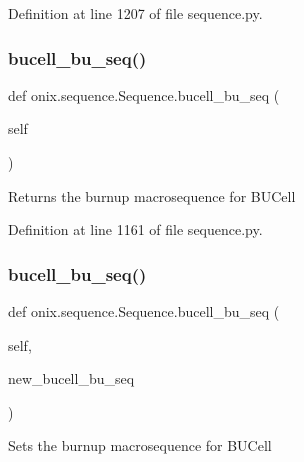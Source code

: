 Definition at line 1207 of file sequence.\+py.

\mbox{\label{classonix_1_1sequence_1_1Sequence_afb77125acf18a4aa9f7bae89253684f0}} 
\subsubsection{\texorpdfstring{bucell\+\_\+bu\+\_\+seq()}{bucell\_bu\_seq()}\hspace{0.1cm}{\footnotesize\ttfamily [1/2]}}
{\footnotesize\ttfamily def onix.\+sequence.\+Sequence.\+bucell\+\_\+bu\+\_\+seq (\begin{DoxyParamCaption}\item[{}]{self }\end{DoxyParamCaption})}

\begin{DoxyVerb}Returns the burnup macrosequence for BUCell
\end{DoxyVerb}
 

Definition at line 1161 of file sequence.\+py.

\mbox{\label{classonix_1_1sequence_1_1Sequence_a9d8dfff357d1253c857116e8ea58fc82}} 
\subsubsection{\texorpdfstring{bucell\+\_\+bu\+\_\+seq()}{bucell\_bu\_seq()}\hspace{0.1cm}{\footnotesize\ttfamily [2/2]}}
{\footnotesize\ttfamily def onix.\+sequence.\+Sequence.\+bucell\+\_\+bu\+\_\+seq (\begin{DoxyParamCaption}\item[{}]{self,  }\item[{}]{new\+\_\+bucell\+\_\+bu\+\_\+seq }\end{DoxyParamCaption})}

\begin{DoxyVerb}Sets the burnup macrosequence for BUCell
\end{DoxyVerb}
 


